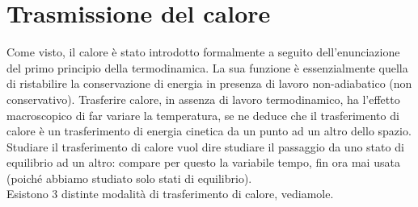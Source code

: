 \documentclass[
10pt, %
a4paper, %
oneside, %
headinclude,footinclude, %
BCOR5mm, %
]{scrartcl}
\begin{document}
\section{Trasmissione del calore}
Come visto, il calore è stato introdotto formalmente a seguito dell'enunciazione del primo principio della termodinamica. La sua funzione è essenzialmente quella di ristabilire la conservazione di energia in presenza di lavoro non-adiabatico (non conservativo). Trasferire calore, in assenza di lavoro termodinamico, ha l'effetto macroscopico di far variare la temperatura, se ne deduce che il trasferimento di calore è un trasferimento di energia cinetica da un punto ad un altro dello spazio. Studiare il trasferimento di calore vuol dire studiare il passaggio da uno stato di equilibrio ad un altro: compare per questo la variabile tempo, fin ora mai usata (poiché abbiamo studiato solo stati di equilibrio).\\
Esistono 3 distinte modalità di trasferimento di calore, vediamole.
\end{document}
